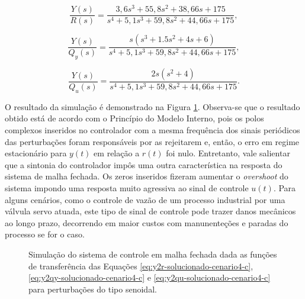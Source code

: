 \begin{equation}
    \label{eq:y2r-solucionado-cenario4-c}
    \frac{Y(s)}{R(s)} = \frac{3,6s^3 + 55,8s^2 + 38,66s + 175}
    {s^4 + 5,1s^3 + 59,8s^2 + 44,66s + 175},
\end{equation}

\begin{equation}
    \label{eq:y2qy-solucionado-cenario4-c}
    \frac{Y(s)}{Q_{y}(s)} = \frac{s(s^3 + 1.5s^2 + 4s + 6)}
    {s^4 + 5,1s^3 + 59,8s^2 + 44,66s + 175},
\end{equation}

\begin{equation}
    \label{eq:y2qu-solucionado-cenario4-c}
    \frac{Y(s)}{Q_{u}(s)} = \frac{ 2s(s^2 + 4)}
    {s^4 + 5,1s^3 + 59,8s^2 + 44,66s + 175}.
\end{equation}

O resultado da simulação é demonstrado na Figura
\ref{fig:resultado-cenario4-c}. Observa-se que o resultado obtido está
de acordo com o Princípio do Modelo Interno, pois os polos complexos inseridos
no controlador com a mesma frequência dos sinais periódicos das perturbações
foram responsáveis por as rejeitarem e, então, o erro em regime estacionário
para $y(t)$ em relação a $r(t)$ foi nulo. Entretanto, vale salientar que a
sintonia do controlador impôs uma outra característica na resposta do sistema de
malha fechada. Os zeros inseridos fizeram aumentar o \textit{overshoot} do sistema
impondo uma resposta muito agressiva ao sinal de controle $u(t)$. Para alguns
cenários, como o controle de vazão de um processo industrial por uma válvula
servo atuada, este tipo de sinal de controle pode trazer danos mecânicos ao
longo prazo, decorrendo em maior custos com manunenteções e paradas do processo
se for o caso.

\begin{figure}[!ht]
    \caption{Simulação do sistema de controle em malha fechada dada as funções
    de transferência das Equações
    \ref{eq:y2r-solucionado-cenario4-c}, \ref{eq:y2qy-solucionado-cenario4-c} e
    \ref{eq:y2qu-solucionado-cenario4-c} para perturbações do tipo senoidal.}
    \vspace{-10pt}
    \hspace{-30pt}
    \label{fig:resultado-cenario4-c}
    \begin{minipage}{\linewidth}
        
    \end{minipage}
\end{figure}
